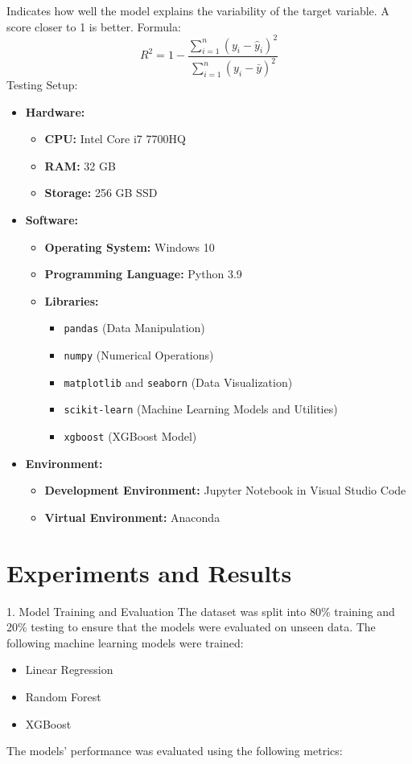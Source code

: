 \documentclass[journal]{IEEEtran}
\begin{document}
Indicates how well the model explains the variability of the target variable. A score closer to 1 is better.\newline
Formula:
\[
R^2 = 1 - \frac{\sum_{i=1}^n (y_i - \hat{y}_i)^2}{\sum_{i=1}^n (y_i - \bar{y})^2}
\]
\vspace{5mm}
Testing Setup:
\begin{itemize}
    \item \textbf{Hardware:}
    \begin{itemize}
        \item \textbf{CPU:} Intel Core i7 7700HQ
        \item \textbf{RAM:} 32 GB
        \item \textbf{Storage:} 256 GB SSD
    \end{itemize}

    \item \textbf{Software:}
    \begin{itemize}
        \item \textbf{Operating System:} Windows 10
        \item \textbf{Programming Language:} Python 3.9
        \item \textbf{Libraries:}
        \begin{itemize}
            \item \texttt{pandas} (Data Manipulation)
            \item \texttt{numpy} (Numerical Operations)
            \item \texttt{matplotlib} and \texttt{seaborn} (Data Visualization)
            \item \texttt{scikit-learn} (Machine Learning Models and Utilities)
            \item \texttt{xgboost} (XGBoost Model)
        \end{itemize}
    \end{itemize}

    \item \textbf{Environment:}
    \begin{itemize}
        \item \textbf{Development Environment:} Jupyter Notebook in Visual Studio Code
        \item \textbf{Virtual Environment:} Anaconda
    \end{itemize}
\end{itemize}
\section{Experiments and Results}
1. Model Training and Evaluation\newline
The dataset was split into 80\% training and 20\% testing to ensure that the models were evaluated on unseen data. The following machine learning models were trained:
\begin{itemize}
    \item Linear Regression
    \item Random Forest
    \item XGBoost
\end{itemize}
The models' performance was evaluated using the following metrics:
\end{document}
